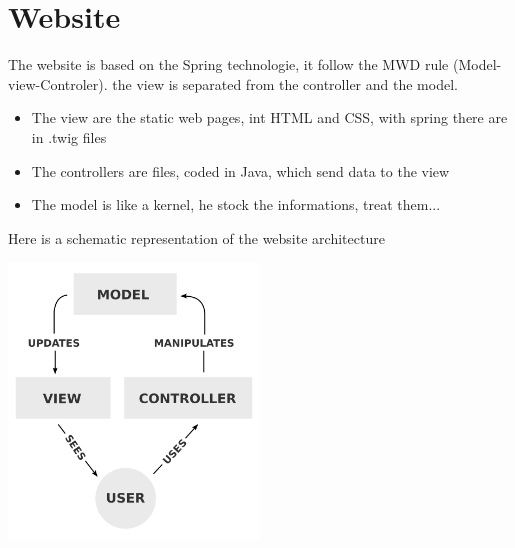 \chapter{Website}

The website is based on the Spring technologie,  it follow the MWD rule (Model-view-Controler). the view is separated from the controller and the model.

\begin{itemize}  
\item The view are the static web pages, int HTML and CSS, with spring there are in .twig files
\item The controllers are files, coded in Java, which send data to the view
\item The model is like a kernel, he stock the informations, treat them...

\end{itemize}  

Here is a schematic representation of the website architecture

\includegraphics[width=0.50\textwidth]{img/mvc.png}



